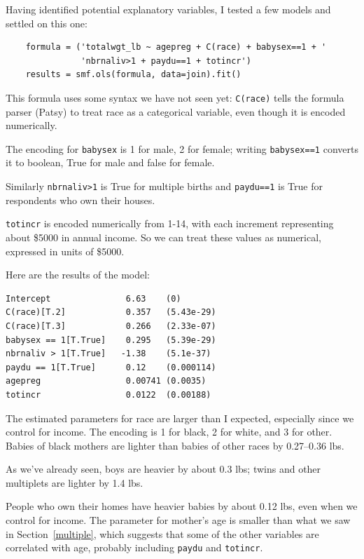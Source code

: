 \documentclass[12pt]{book}
\begin{document}
Having identified potential explanatory variables, I tested a few
models and settled on this one:

\begin{verbatim}
    formula = ('totalwgt_lb ~ agepreg + C(race) + babysex==1 + '
               'nbrnaliv>1 + paydu==1 + totincr')
    results = smf.ols(formula, data=join).fit()
\end{verbatim}

This formula uses some syntax we have not seen yet:
\verb"C(race)" tells the formula parser (Patsy) to treat race as a
categorical variable, even though it is encoded numerically.

The encoding for \verb"babysex" is 1 for male, 2 for female; writing
\verb"babysex==1" converts it to boolean, True for male and false for
female.

Similarly \verb"nbrnaliv>1" is True for multiple births and 
\verb"paydu==1" is True for respondents who own their houses.

\verb"totincr" is encoded numerically from 1-14, with each increment
representing about \$5000 in annual income.  So we can treat these
values as numerical, expressed in units of \$5000.

Here are the results of the model:

\begin{verbatim}
Intercept               6.63    (0)
C(race)[T.2]            0.357   (5.43e-29)
C(race)[T.3]            0.266   (2.33e-07)
babysex == 1[T.True]    0.295   (5.39e-29)
nbrnaliv > 1[T.True]   -1.38    (5.1e-37)
paydu == 1[T.True]      0.12    (0.000114)
agepreg                 0.00741 (0.0035)
totincr                 0.0122  (0.00188)
\end{verbatim}

The estimated parameters for race are larger than I expected,
especially since we control for income.  The encoding
is 1 for black, 2 for white, and 3 for other.  Babies of black
mothers are lighter than babies of other races by 0.27--0.36 lbs.

As we've already seen, boys are heavier by about 0.3 lbs;
twins and other multiplets are lighter by 1.4 lbs.

People who own their homes have heavier babies by about 0.12 lbs,
even when we control for income.  The parameter for mother's
age is smaller than what we saw in Section~\ref{multiple}, which
suggests that some of the other variables are correlated with
age, probably including \verb"paydu" and \verb"totincr".
\end{document}
